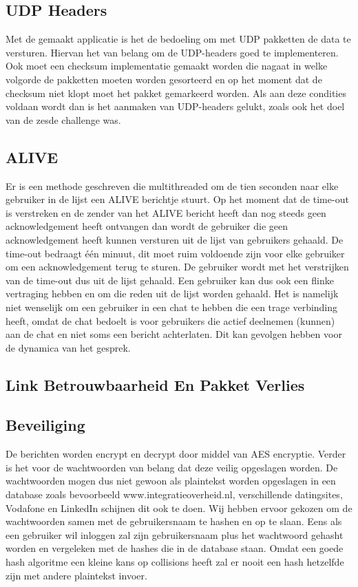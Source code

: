 \documentclass[12pt]{article}
\begin{document}
\subsection{UDP Headers}
Met de gemaakt applicatie is het de bedoeling om met UDP pakketten de data te versturen. Hiervan het van belang om de UDP-headers goed te implementeren. Ook moet een checksum implementatie gemaakt worden die nagaat in welke volgorde de pakketten moeten worden gesorteerd en op het moment dat de checksum niet klopt moet het pakket gemarkeerd worden. Als aan deze condities voldaan wordt dan is het aanmaken van UDP-headers gelukt, zoals ook het doel van de zesde challenge was. 


\subsection{ALIVE}
Er is een methode geschreven die multithreaded om de tien seconden naar elke gebruiker in de lijst een ALIVE berichtje stuurt. Op het moment dat de time-out is verstreken en de zender van het ALIVE bericht heeft dan nog steeds geen acknowledgement heeft ontvangen dan wordt de gebruiker die geen acknowledgement heeft kunnen versturen uit de lijst van gebruikers gehaald. De time-out bedraagt \'e\'en minuut, dit moet ruim voldoende zijn voor elke gebruiker om een acknowledgement terug te sturen. De gebruiker wordt met het verstrijken van de time-out dus uit de lijst gehaald. Een gebruiker kan dus ook een flinke vertraging hebben en om die reden uit de lijst worden gehaald. Het is namelijk niet wenselijk om een gebruiker in een chat te hebben die een trage verbinding heeft, omdat de chat bedoelt is voor gebruikers die actief deelnemen (kunnen) aan de chat en niet soms een bericht achterlaten. Dit kan gevolgen hebben voor de dynamica van het gesprek.

\subsection{Link Betrouwbaarheid En Pakket Verlies}

\subsection{Beveiliging}
De berichten worden encrypt en decrypt door middel van AES encryptie. Verder is het voor de wachtwoorden van belang dat deze veilig opgeslagen worden. De wachtwoorden mogen dus niet gewoon als plaintekst worden opgeslagen in een database zoals bevoorbeeld www.integratieoverheid.nl, verschillende datingsites, Vodafone en LinkedIn schijnen dit ook te doen. Wij hebben ervoor gekozen om de wachtwoorden samen met de gebruikersnaam te hashen en op te slaan. Eens als een gebruiker wil inloggen zal zijn gebruikersnaam plus het wachtwoord gehasht worden en vergeleken met de hashes die in de database staan. Omdat een goede hash algoritme een kleine kans op collisions heeft zal er nooit een hash hetzelfde zijn met andere plaintekst invoer.
\end{document}
